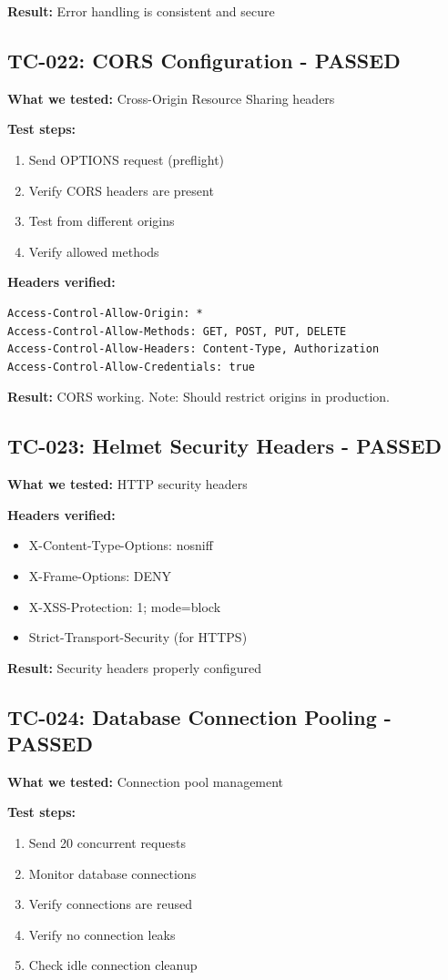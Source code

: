 \documentclass[11pt,a4paper]{article}
\begin{document}
\textbf{Result:} Error handling is consistent and secure

\subsection{TC-022: CORS Configuration - PASSED}
\textbf{What we tested:} Cross-Origin Resource Sharing headers

\textbf{Test steps:}
\begin{enumerate}
    \item Send OPTIONS request (preflight)
    \item Verify CORS headers are present
    \item Test from different origins
    \item Verify allowed methods
\end{enumerate}

\textbf{Headers verified:}
\begin{lstlisting}
Access-Control-Allow-Origin: *
Access-Control-Allow-Methods: GET, POST, PUT, DELETE
Access-Control-Allow-Headers: Content-Type, Authorization
Access-Control-Allow-Credentials: true
\end{lstlisting}

\textbf{Result:} CORS working. Note: Should restrict origins in production.

\subsection{TC-023: Helmet Security Headers - PASSED}
\textbf{What we tested:} HTTP security headers

\textbf{Headers verified:}
\begin{itemize}
    \item X-Content-Type-Options: nosniff
    \item X-Frame-Options: DENY
    \item X-XSS-Protection: 1; mode=block
    \item Strict-Transport-Security (for HTTPS)
\end{itemize}

\textbf{Result:} Security headers properly configured

\subsection{TC-024: Database Connection Pooling - PASSED}
\textbf{What we tested:} Connection pool management

\textbf{Test steps:}
\begin{enumerate}
    \item Send 20 concurrent requests
    \item Monitor database connections
    \item Verify connections are reused
    \item Verify no connection leaks
    \item Check idle connection cleanup
\end{enumerate}
\end{document}
